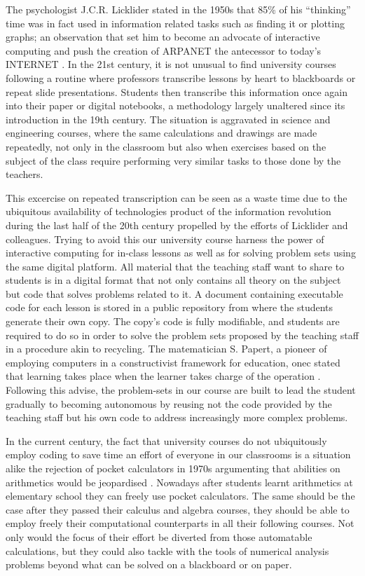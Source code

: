The psychologist J.C.R. Licklider stated in the 1950s that 85\% of his ``thinking'' time was in fact used in information related tasks such as finding it or plotting graphs; an observation that set him to become an advocate of interactive computing and push the creation of ARPANET the antecessor to today's INTERNET \cite{waldrop_dream_2001}.
In the 21st century, it is not unusual to find university courses following a routine where professors transcribe lessons by heart to blackboards or repeat slide presentations. Students then transcribe this information once again into their paper or digital notebooks, a methodology largely unaltered since its introduction in the 19th century.
The situation is aggravated in science and engineering courses, where the same calculations and drawings are made repeatedly, not only in the classroom but also when exercises based on the subject of the class require performing very similar tasks to those done by the teachers.

This excercise on repeated transcription can be seen as a waste time due to the ubiquitous availability of technologies product of the information revolution during the last half of the 20th century propelled by the efforts of Licklider and colleagues.
Trying to avoid this our university course harness the power of interactive computing for in-class lessons as well as for solving problem sets using the same digital platform. 
All material that the teaching staff want to share to students is in a digital format that not only contains all theory on the subject but code that solves problems related to it.
A document containing executable code for each lesson is stored in a public repository from where the students generate their own copy.
The copy's code is fully modifiable, and students are required to do so in order to solve the problem sets proposed by the teaching staff in a procedure akin to recycling.
The matematician S. Papert, a pioneer of employing computers in a constructivist framework for education, onec stated that learning takes place when the learner takes charge of the operation \cite{papert_childrens_1993}.
Following this advise, the problem-sets in our course are built to lead the student gradually to becoming autonomous by reusing not the code provided by the teaching staff but his own code to address increasingly more complex problems.

In the current century, the fact that university courses do not ubiquitously employ coding to save time an effort of everyone in our classrooms is a situation alike the rejection of pocket calculators in 1970s argumenting that abilities on arithmetics would be jeopardised \cite{roberts_impact_1980}.
Nowadays after students learnt arithmetics at elementary school they can freely use pocket calculators.
The same should be the case after they passed their calculus and algebra courses, they should be able to employ freely their computational counterparts in all their following courses.
Not only would the focus of their effort be diverted from those automatable calculations, but they could also tackle with the tools of numerical analysis problems beyond what can be solved on a blackboard or on paper.
